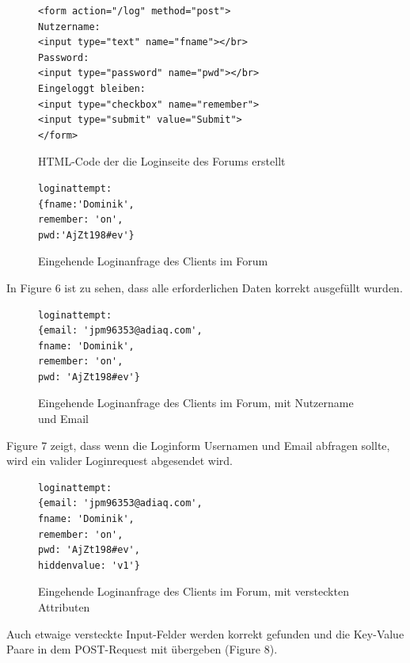\begin{figure}[ht]
\begin{lstlisting}[language=HTML5]
<form action="/log" method="post">
Nutzername: 
<input type="text" name="fname"></br>
Password: 
<input type="password" name="pwd"></br>
Eingeloggt bleiben: 
<input type="checkbox" name="remember">
<input type="submit" value="Submit">
</form>
\end{lstlisting}
\caption{HTML-Code der die Loginseite des Forums erstellt}
\end{figure}
\newpage

\begin{figure}[h!]
\begin{lstlisting}[language=HTML5]
loginattempt: 
{fname:'Dominik',
remember: 'on',
pwd:'AjZt198#ev'}
\end{lstlisting}
\caption{Eingehende Loginanfrage des Clients im Forum}
\end{figure}

In Figure 6 ist zu sehen, dass alle erforderlichen Daten korrekt ausgefüllt wurden.

\begin{figure}[h!]
\begin{lstlisting}[language=HTML5]
loginattempt:
{email: 'jpm96353@adiaq.com',
fname: 'Dominik',
remember: 'on',
pwd: 'AjZt198#ev'}
\end{lstlisting}
\caption{Eingehende Loginanfrage des Clients im Forum, mit Nutzername und Email}
\end{figure}
Figure 7 zeigt, dass wenn die Loginform Usernamen und Email abfragen sollte, wird ein valider Loginrequest abgesendet wird.

\begin{figure}[h!]
\begin{lstlisting}[language=HTML5]
loginattempt:
{email: 'jpm96353@adiaq.com',
fname: 'Dominik',
remember: 'on',
pwd: 'AjZt198#ev',
hiddenvalue: 'v1'}
\end{lstlisting}
\caption{Eingehende Loginanfrage des Clients im Forum, mit versteckten Attributen}
\end{figure}

Auch etwaige versteckte Input-Felder werden korrekt gefunden und die Key-Value Paare in dem POST-Request mit übergeben (Figure 8).
\newpage

